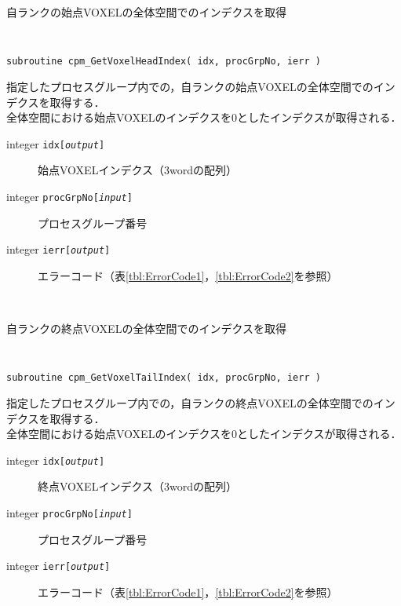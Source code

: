 \begin{spacing}{0.8}
\begin{itembox}[l]{自ランクの始点VOXELの全体空間でのインデクスを取得}
{\tt
\begin{verbatim}
subroutine cpm_GetVoxelHeadIndex( idx, procGrpNo, ierr )
\end{verbatim}
}
指定したプロセスグループ内での，自ランクの始点VOXELの全体空間でのインデクスを取得する．\\
全体空間における始点VOXELのインデクスを0としたインデクスが取得される．
\begin{description}
\item[integer {\tt idx[{\it output}]}] 始点VOXELインデクス（3wordの配列）
\item[integer {\tt procGrpNo[{\it input}]}] プロセスグループ番号
\item[integer {\tt ierr[{\it output}]}] エラーコード（表\ref{tbl:ErrorCode1}，\ref{tbl:ErrorCode2}を参照）
\end{description}
\end{itembox}\\
\end{spacing}

\begin{spacing}{0.8}
\begin{itembox}[l]{自ランクの終点VOXELの全体空間でのインデクスを取得}
{\tt
\begin{verbatim}
subroutine cpm_GetVoxelTailIndex( idx, procGrpNo, ierr )
\end{verbatim}
}
指定したプロセスグループ内での，自ランクの終点VOXELの全体空間でのインデクスを取得する．\\
全体空間における始点VOXELのインデクスを0としたインデクスが取得される．
\begin{description}
\item[integer {\tt idx[{\it output}]}] 終点VOXELインデクス（3wordの配列）
\item[integer {\tt procGrpNo[{\it input}]}] プロセスグループ番号
\item[integer {\tt ierr[{\it output}]}] エラーコード（表\ref{tbl:ErrorCode1}，\ref{tbl:ErrorCode2}を参照）
\end{description}
\end{itembox}\\
\end{spacing}

